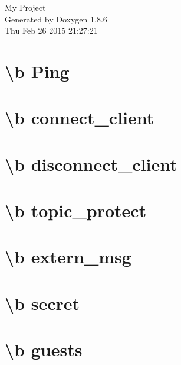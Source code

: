 \documentclass[twoside]{book}
\newcommand{\clearemptydoublepage}{%
  \newpage{\pagestyle{empty}\cleardoublepage}%
}
\begin{document}
\hypersetup{pageanchor=false}
\begin{titlepage}
\vspace*{7cm}
\begin{center}%
{\Large My Project }\\
\vspace*{1cm}
{\large Generated by Doxygen 1.8.6}\\
\vspace*{0.5cm}
{\small Thu Feb 26 2015 21:27:21}\\
\end{center}
\end{titlepage}
\clearemptydoublepage
\tableofcontents
\clearemptydoublepage
{}
\hypersetup{pageanchor=true}

\chapter{\textbackslash{}b Ping}
\label{Ping}
\hypertarget{Ping}{}

\chapter{\textbackslash{}b connect\-\_\-client}
\label{connect_client}
\hypertarget{connect_client}{}

\chapter{\textbackslash{}b disconnect\-\_\-client}
\label{disconnect_client}
\hypertarget{disconnect_client}{}

\chapter{\textbackslash{}b topic\-\_\-protect}
\label{topic_protect}
\hypertarget{topic_protect}{}

\chapter{\textbackslash{}b extern\-\_\-msg}
\label{extern_msg}
\hypertarget{extern_msg}{}

\chapter{\textbackslash{}b secret}
\label{secret}
\hypertarget{secret}{}

\chapter{\textbackslash{}b guests}
\label{guests}
\hypertarget{guests}{}

\end{document}
